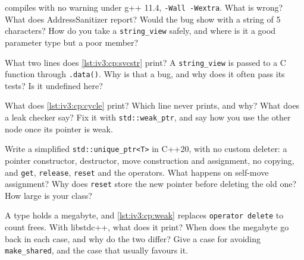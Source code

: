 \begin{question}\label{iq:iv3:cpp:20}
 compiles with no warning under g++ 11.4, \texttt{-Wall -Wextra}. What is wrong? What does AddressSanitizer report? Would the bug show with a string of 5 characters? How do you take a \texttt{string\_view} safely, and where is it a good parameter type but a poor member?
\label{lst:iv3:cp:svtemp}
\end{question}

\begin{question}\label{iq:iv3:cpp:21}
What two lines does \cref{lst:iv3:cp:svcstr} print? A \texttt{string\_view} is passed to a C function through \texttt{.data()}. Why is that a bug, and why does it often pass its tests? Is it undefined here?
\label{lst:iv3:cp:svcstr}
\end{question}

\begin{question}\label{iq:iv3:cpp:22}
What does \cref{lst:iv3:cp:cycle} print? Which line never prints, and why? What does a leak checker say? Fix it with \texttt{std::weak\_ptr}, and say how you use the other node once its pointer is weak.
\label{lst:iv3:cp:cycle}
\end{question}

\begin{question}\label{iq:iv3:cpp:23}
Write a simplified \texttt{std::unique\_ptr<T>} in C++20, with no custom deleter: a pointer constructor, destructor, move construction and assignment, no copying, and \texttt{get}, \texttt{release}, \texttt{reset} and the operators. What happens on self-move assignment? Why does \texttt{reset} store the new pointer before deleting the old one? How large is your class?
\end{question}

\begin{question}\label{iq:iv3:cpp:24}
A type holds a megabyte, and \cref{lst:iv3:cp:weak} replaces \texttt{operator delete} to count frees. With libstdc++, what does it print? When does the megabyte go back in each case, and why do the two differ? Give a case for avoiding \texttt{make\_shared}, and the case that usually favours it.
\label{lst:iv3:cp:weak}
\end{question}

